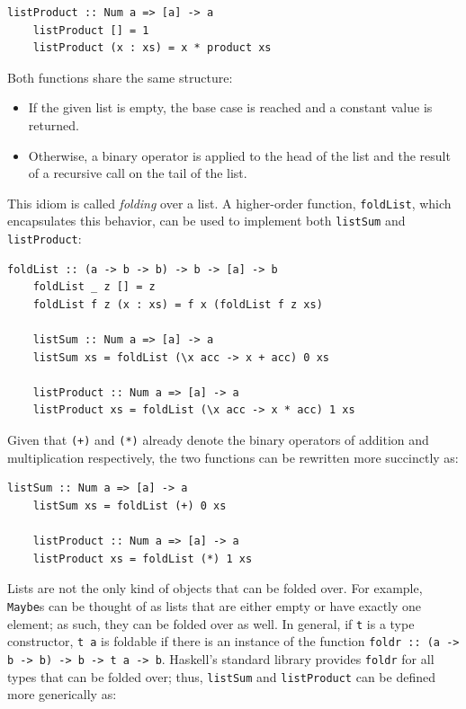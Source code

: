 \documentclass[UdineBachThesis,american,11pt]{PhdThesis}
\begin{document}
  \pagebreak

  \begin{Verbatim}[gobble=4,fontsize=\small]
    listProduct :: Num a => [a] -> a
    listProduct [] = 1
    listProduct (x : xs) = x * product xs
  \end{Verbatim}

  Both functions share the same structure:

  \begin{itemize}
    \item If the given list is empty, the base case is reached and a constant
    value is returned.

    \item Otherwise, a binary operator is applied to the head of the list and
    the result of a recursive call on the tail of the list.
  \end{itemize}

  This idiom is called \emph{folding} over a list. A higher-order function,
  \mbox{\texttt{foldList}}, which encapsulates this behavior, can be used to
  implement both \mbox{\texttt{listSum}} and \mbox{\texttt{listProduct}}:

  \begin{Verbatim}[gobble=4,fontsize=\small]
    foldList :: (a -> b -> b) -> b -> [a] -> b
    foldList _ z [] = z
    foldList f z (x : xs) = f x (foldList f z xs)

    listSum :: Num a => [a] -> a
    listSum xs = foldList (\x acc -> x + acc) 0 xs

    listProduct :: Num a => [a] -> a
    listProduct xs = foldList (\x acc -> x * acc) 1 xs
  \end{Verbatim}

  Given that \mbox{\texttt{(+)}} and \mbox{\texttt{(*)}} already denote the
  binary operators of addition and multiplication respectively, the two
  functions can be rewritten more succinctly as:

  \begin{Verbatim}[gobble=4,fontsize=\small]
    listSum :: Num a => [a] -> a
    listSum xs = foldList (+) 0 xs

    listProduct :: Num a => [a] -> a
    listProduct xs = foldList (*) 1 xs
  \end{Verbatim}

  Lists are not the only kind of objects that can be folded over. For example,
  \mbox{\texttt{Maybe}s} can be thought of as lists that are either empty or
  have exactly one element; as such, they can be folded over as well. In
  general, if \texttt{t} is a type constructor, \mbox{\texttt{t a}} is foldable
  if there is an instance of the function
  \mbox{\texttt{foldr :: (a -> b -> b) -> b -> t a -> b}}. Haskell's standard
  library provides \mbox{\texttt{foldr}} for all types that can be folded over;
  thus, \mbox{\texttt{listSum}} and \mbox{\texttt{listProduct}} can be defined
  more generically as:
\end{document}
